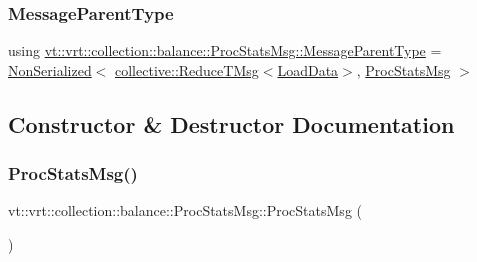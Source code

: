\subsubsection{\texorpdfstring{Message\+Parent\+Type}{MessageParentType}}
{\footnotesize\ttfamily using \hyperlink{structvt_1_1vrt_1_1collection_1_1balance_1_1_proc_stats_msg_a883f509d9a4ce6f095a9a680e5199cde}{vt\+::vrt\+::collection\+::balance\+::\+Proc\+Stats\+Msg\+::\+Message\+Parent\+Type} =  \hyperlink{namespacevt_a378e4a02213923b4ba1c3f9d2a1424c7}{Non\+Serialized}$<$ \hyperlink{namespacevt_1_1collective_a28b82d5d48c9bc6e4fd738fcbf9e0f62}{collective\+::\+Reduce\+T\+Msg}$<$\hyperlink{structvt_1_1vrt_1_1collection_1_1balance_1_1_load_data}{Load\+Data}$>$, \hyperlink{structvt_1_1vrt_1_1collection_1_1balance_1_1_proc_stats_msg}{Proc\+Stats\+Msg} $>$}



\subsection{Constructor \& Destructor Documentation}
\mbox{\label{structvt_1_1vrt_1_1collection_1_1balance_1_1_proc_stats_msg_a2466595ab497ed3f3e3fccb7ad6e3aa6}} 
\subsubsection{\texorpdfstring{Proc\+Stats\+Msg()}{ProcStatsMsg()}\hspace{0.1cm}{\footnotesize\ttfamily [1/3]}}
{\footnotesize\ttfamily vt\+::vrt\+::collection\+::balance\+::\+Proc\+Stats\+Msg\+::\+Proc\+Stats\+Msg (\begin{DoxyParamCaption}{ }\end{DoxyParamCaption})\hspace{0.3cm}{\ttfamily [default]}}

\mbox{\label{structvt_1_1vrt_1_1collection_1_1balance_1_1_proc_stats_msg_ac4b5ac7c62b0485b23113a2eb3cef658}} 
